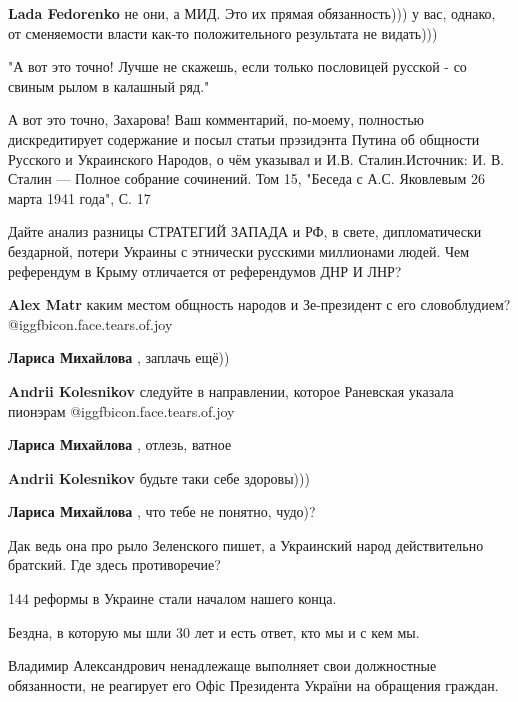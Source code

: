 \begin{itemize}
\begin{itemize}
\textbf{Lada Fedorenko} не они, а МИД. Это их прямая обязанность))) у вас, однако, от сменяемости власти как-то положительного результата не видать)))

\end{itemize} %


"А вот это точно! Лучше не скажешь, если только пословицей русской - со свиным
рылом в калашный ряд."

А вот это точно, Захарова! Ваш комментарий, по-моему, полностью дискредитирует
содержание и посыл статьи прэзидэнта Путина об общности Русского и Украинского
Народов, о чём указывал и И.В. Сталин.Источник: И. В. Сталин — Полное собрание
сочинений. Том 15, "Беседа с А.С. Яковлевым 26 марта 1941 года", С. 17

Дайте анализ разницы СТРАТЕГИЙ ЗАПАДА и РФ, в свете, дипломатически бездарной,
потери Украины с этнически русскими миллионами людей. Чем референдум в Крыму
отличается от референдумов ДНР И ЛНР?

\begin{itemize} %
\textbf{Alex Matr} каким местом общность народов и Зе-президент с его словоблудием? @igg{fbicon.face.tears.of.joy} 

\textbf{Лариса Михайлова} , заплачь ещё))

\textbf{Andrii Kolesnikov} следуйте в направлении, которое Раневская указала пионэрам  @igg{fbicon.face.tears.of.joy} 

\textbf{Лариса Михайлова} , отлезь, ватное

\textbf{Andrii Kolesnikov} будьте таки себе здоровы)))

\textbf{Лариса Михайлова} , что тебе не понятно, чудо)?

Дак ведь она про рыло Зеленского пишет, а Украинский народ действительно братский. Где здесь противоречие?
\end{itemize} %


144 реформы в Украине стали началом нашего конца.

Бездна, в которую мы шли 30 лет и есть ответ, кто мы и с кем мы.

Владимир Александрович ненадлежаще выполняет свои должностные обязанности, не
реагирует его Офіс Президента України на обращения граждан.


\end{itemize}
